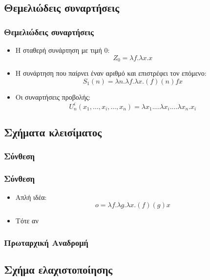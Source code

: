 \documentclass{beamer}
\begin{document}
\subsection{Θεμελιώδεις συναρτήσεις}
\begin{frame}
        \frametitle{Θεμελιώδεις συναρτήσεις}
        \begin{itemize}
                \item Η σταθερή συνάρτηση με τιμή 0: \[Z_0=\lambda f . \lambda x . x\]
                \pause
                \item Η συνάρτηση που παίρνει έναν αριθμό και επιστρέφει τον επόμενο: \[S_1(n)=\lambda n . \lambda f . \lambda x . (f) (n) f x\]
                \pause
                \item Οι συναρτήσεις προβολής: \[U^i_n(x_1,\ldots,x_i,\ldots,x_n)= \lambda x_1 . \ldots \lambda x_i . \ldots \lambda x_n . x_i\]
        \end{itemize}
\end{frame}
\subsection{Σχήματα κλεισίματος}
\subsubsection{Σύνθεση}
\begin{frame}
        \frametitle{Σύνθεση}
        \begin{itemize}
                \item Απλή ιδέα: \[o = \lambda f. \lambda g. \lambda x . (f) (g) x\]
                \pause
                \item Τότε αν 
        \end{itemize}
\end{frame}

\subsubsection{Πρωταρχική Αναδρομή}
\subsection{Σχήμα ελαχιστοποίησης}
\end{document}

